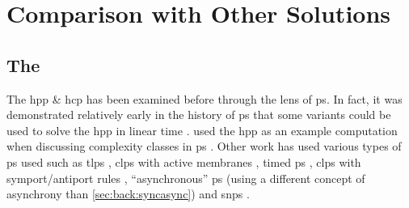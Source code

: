 \section{Comparison with Other  Solutions}


\subsection{The }


The \gls{hpp} \& \gls{hcp} has been examined before through the lens of \gls{ps}.  In fact, it was demonstrated relatively early in the history of \gls{ps} that some variants could be used to solve the \gls{hpp} in linear time \cite{Mutyam2001}.  \citeauthor{Jimenez2003} used the \gls{hpp} as an example computation when discussing complexity classes in \gls{ps} \cite{Jimenez2003}.  %
Other work has used various types of \gls{ps} used such as \gls{tlps} \cite{Martin-Vide2003}, \gls{clps} with active membranes \cite{Pan2006,Chen2009}, timed \gls{ps} \cite{Song2013}, \gls{clps} with symport/antiport rules \cite{Orellana-Martin2019a}, ``asynchronous'' \gls{ps} \cite{Tagawa2012} (using a different concept of asynchrony than \cref{sec:back:syncasync}) and \gls{snps} \cite{Xue2013}.

